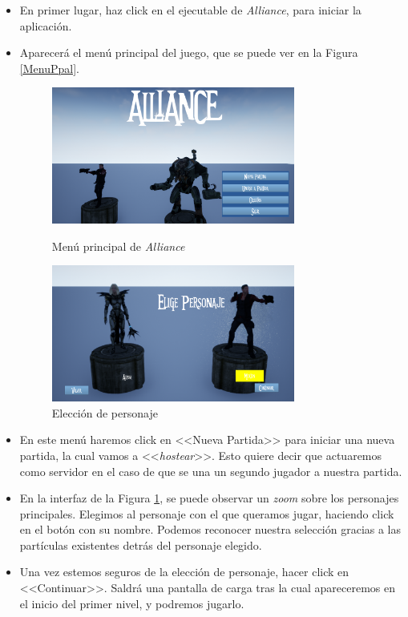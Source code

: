\begin{itemize}
\item En primer lugar, haz click en el ejecutable de \textit{Alliance}, para iniciar la aplicación.
\item Aparecerá el menú principal del juego, que se puede ver en la Figura \ref{MenuPpal}.

\begin{figure}[H]
  \begin{minipage}{0.5\textwidth}
    \centering
    \includegraphics[width=8cm]{./images/MenuPpal.png}
    \caption{Menú principal de \textit{Alliance}}
    \label{MenuPpal}
  \end{minipage}%
  \hspace{1mm}
  \begin{minipage}{0.5\textwidth}
    \centering
    \includegraphics[width=8cm]{./images/EleccPers.png}
    \caption{Elección de personaje}
    \label{EleccPers}
  \end{minipage}
\end{figure}

\item En este menú haremos click en <<Nueva Partida>> para iniciar una nueva partida, la cual vamos a <<\textit{hostear}>>. Esto quiere decir que actuaremos como servidor en el caso de que se una un segundo jugador a nuestra partida. 

\item En la interfaz de la Figura \ref{EleccPers}, se puede observar un \textit{zoom} sobre los personajes principales. Elegimos al personaje con el que queramos jugar, haciendo click en el botón con su nombre. Podemos reconocer nuestra selección gracias a las partículas existentes detrás del personaje elegido. 

\item Una vez estemos seguros de la elección de personaje, hacer click en <<Continuar>>. Saldrá una pantalla de carga tras la cual apareceremos en el inicio del primer nivel, y podremos jugarlo.
\end{itemize}

